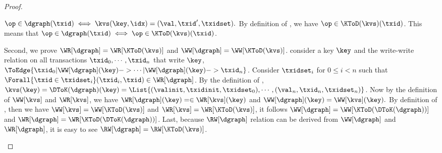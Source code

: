 \begin{proof}
\begin{enumerate}
\begin{enumerate}
        \( 
        \op \in \dgraph(\txid) \iff \kvs(\key,\idx) = (\val,\txid',\txidset) .
        \)
        By definition of \KToD, we have \( \op \in \KToD(\kvs)(\txid)\).
        This means that \( \op \in \dgraph(\txid) \iff \op \in \KToD(\kvs)(\txid)\).
    \end{enumerate}
    Second, we prove \( \WR[\dgraph] = \WR[\KToD(\kvs)]\) and  \( \WW[\dgraph] = \WW[\KToD(\kvs)]\).
    consider a key \( \key \) and the write-write relation 
    on all transactions \( \txid_0, \cdots, \txid_n \) that write \( \key \),
    \( \ToEdge{\txid_0 | \WW[\dgraph](\key) -> \cdots | \WW[\dgraph](\key) -> \txid_n } \).
    Consider \( \txidset_i \) for \( 0 \leq i < n\) such that
    \( \Forall{\txid \in \txidset_i} (\txid_i,\txid) \in \WR[\dgraph] \).
    By the definition of \DToK,
    \( \kvs(\key) = \DToK(\dgraph)(\key) = 
        \List{(\valinit,\txidinit,\txidset_0), \cdots,(\val_n,\txid_n,\txidset_n) } \).
    Now by the definition of \( \WW[\kvs] \) and \( \WR[\kvs] \), 
    we have \( \WR[\dgraph](\key) = \in \WR[\kvs](\key) \)
    and \( \WW[\dgraph](\key)  = \WW[\kvs](\key). \)
    By definition of \KToD, then we have \( \WW[\kvs] = \WW[\KToD(\kvs)]\) and \(  \WR[\kvs] = \WR[\KToD(\kvs)] \),
    it follows \(  \WW[\dgraph] = \WW[\KToD(\DToK(\dgraph))]\) and \(  \WR[\dgraph] = \WR[\KToD(\DToK(\dgraph))] \).
    Last, because \( \RW[\dgraph] \) relation can be derived from \( \WW[\dgraph] \) and \( \WR[\dgraph] \),
    it is easy to see \( \RW[\dgraph] = \RW[\KToD(\kvs)] \). \qedhere
\end{enumerate}
\end{proof}
